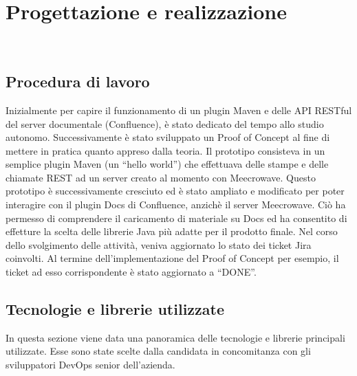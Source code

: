 
\chapter{Progettazione e realizzazione}
\label{cap:progettazione}

\\

\section{Procedura di lavoro}
Inizialmente per capire il funzionamento di un plugin Maven e delle API RESTful del server documentale (Confluence), è stato dedicato del tempo allo studio autonomo.
Successivamente è stato sviluppato un Proof of Concept al fine di mettere in pratica quanto appreso dalla teoria.
Il prototipo consisteva in un semplice plugin Maven (un ``hello world'') che effettuava delle stampe e delle chiamate REST ad un server creato al momento con Meecrowave.
Questo prototipo è successivamente cresciuto ed è stato ampliato e modificato per poter interagire con il plugin Docs di Confluence, anzichè il server Meecrowave.
Ciò ha permesso di comprendere il caricamento di materiale su Docs ed ha consentito di effetture la scelta delle librerie Java più adatte per il prodotto finale.
Nel corso dello svolgimento delle attività, veniva aggiornato lo stato dei ticket Jira coinvolti.
Al termine dell'implementazione del Proof of Concept per esempio, il ticket ad esso corrispondente è stato aggiornato a ``DONE''.

\section{Tecnologie e librerie utilizzate}
\label{sec:tecnologie-strumenti}

In questa sezione viene data una panoramica delle tecnologie e librerie principali utilizzate.
Esse sono state scelte dalla candidata in concomitanza con gli sviluppatori DevOps senior dell'azienda.


